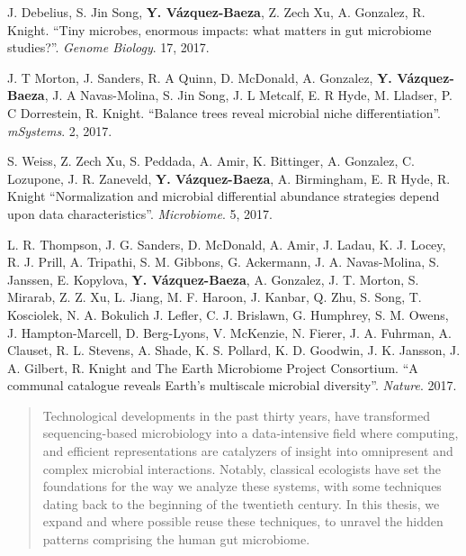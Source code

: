 \begin{frontmatter}
\begin{vitapage}
\begin{publications}
    \item J. Debelius, S. Jin Song, \textbf{Y. V\'azquez-Baeza}, Z. Zech Xu, A. Gonzalez, R. Knight. ``Tiny microbes, enormous impacts: what matters in gut microbiome studies?''. \emph{Genome Biology}. 17, 2017.

    \item J. T Morton, J. Sanders, R. A Quinn, D. McDonald, A. Gonzalez, \textbf{Y. V\'azquez-Baeza}, J. A Navas-Molina, S. Jin Song, J. L Metcalf, E. R Hyde, M. Lladser, P. C Dorrestein, R. Knight. ``Balance trees reveal microbial niche differentiation''. \emph{mSystems}. 2, 2017.

    \item S. Weiss, Z. Zech Xu, S. Peddada, A. Amir, K. Bittinger, A. Gonzalez, C. Lozupone, J. R. Zaneveld, \textbf{Y. V\'azquez-Baeza}, A. Birmingham, E. R Hyde, R. Knight ``Normalization and microbial differential abundance strategies depend upon data characteristics''. \emph{Microbiome}. 5, 2017.

    \item L. R. Thompson, J. G. Sanders, D. McDonald, A. Amir, J. Ladau, K. J.  
        Locey, R. J. Prill, A. Tripathi, S. M.  Gibbons, G. Ackermann, J. A.  
        Navas-Molina, S. Janssen, E. Kopylova, \textbf{Y. V\'azquez-Baeza}, A.  
        Gonzalez, J. T. Morton, S. Mirarab, Z. Z. Xu, L. Jiang, M. F.  Haroon, 
        J.  Kanbar, Q.  Zhu, S. Song, T. Kosciolek, N. A. Bokulich J. Lefler, 
        C. J.  Brislawn, G. Humphrey, S. M. Owens, J. Hampton-Marcell, D.  
        Berg-Lyons, V. McKenzie, N. Fierer, J. A. Fuhrman, A. Clauset, R. L.  
        Stevens, A.  Shade, K. S. Pollard, K. D. Goodwin, J. K. Jansson, J. A.  
        Gilbert, R.  Knight and The Earth Microbiome Project Consortium. ``A 
        communal catalogue reveals Earth’s multiscale microbial diversity''.
        \emph{Nature}. 2017.
\end{publications}

\end{vitapage}


%
%
\begin{abstract}

    Technological developments in the past thirty years, have transformed 
    sequencing\hyp{}based microbiology into a data-intensive field where 
    computing, and efficient representations are catalyzers of insight into 
    omnipresent and complex microbial interactions. Notably, classical 
    ecologists have set the foundations for the way we analyze these systems, 
    with some techniques dating back to the beginning of the twentieth century.  
    In this thesis, we expand and where possible reuse these techniques, to 
    unravel the hidden patterns comprising the human gut microbiome.


\end{abstract}
\end{frontmatter}
